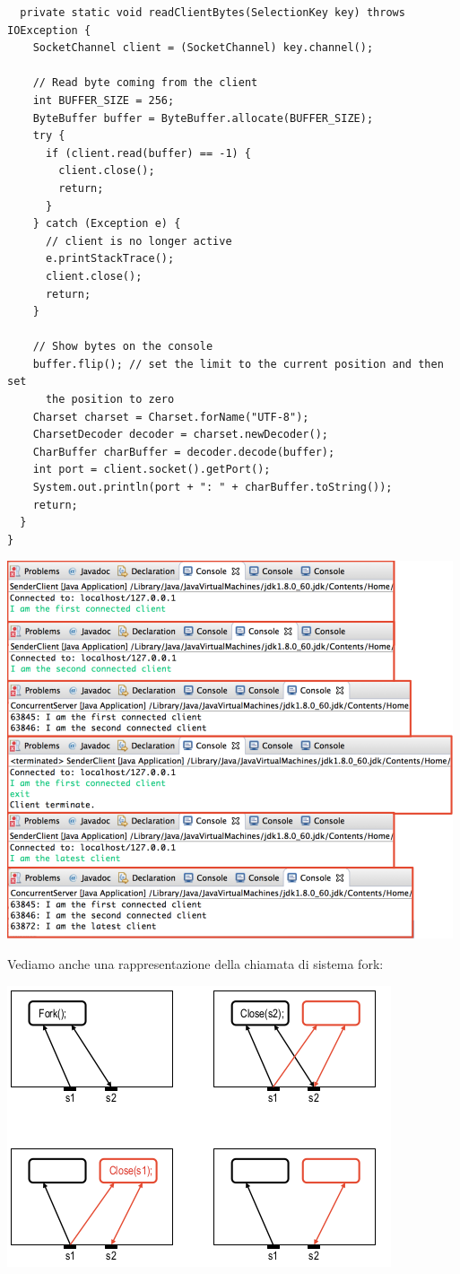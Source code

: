 \documentclass[a4paper,12pt, oneside]{book}
\begin{document}
\begin{verbatim}
  private static void readClientBytes(SelectionKey key) throws IOException {
    SocketChannel client = (SocketChannel) key.channel();

    // Read byte coming from the client
    int BUFFER_SIZE = 256;
    ByteBuffer buffer = ByteBuffer.allocate(BUFFER_SIZE);
    try {
      if (client.read(buffer) == -1) {
        client.close();
        return;
      }
    } catch (Exception e) {
      // client is no longer active
      e.printStackTrace();
      client.close();
      return;
    }

    // Show bytes on the console
    buffer.flip(); // set the limit to the current position and then set 
      the position to zero 
    Charset charset = Charset.forName("UTF-8");
    CharsetDecoder decoder = charset.newDecoder();
    CharBuffer charBuffer = decoder.decode(buffer);
    int port = client.socket().getPort();
    System.out.println(port + ": " + charBuffer.toString());
    return;
  }
}

\end{verbatim}
\begin{center}
	\includegraphics[scale=3]{img/conc5.png}
\end{center}
Vediamo anche una rappresentazione della chiamata di sistema fork:
\begin{center}
	\includegraphics[scale=0.7]{img/fork.png}
\end{center}
\end{document}
